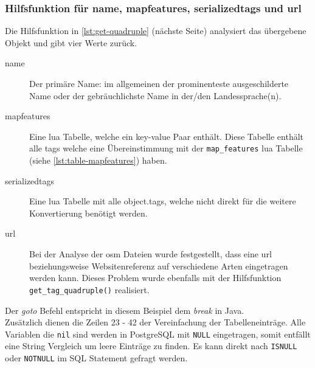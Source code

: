 \subsubsection{Hilfsfunktion für name, mapfeatures, serializedtags und url}\label{subsubsec:get.quadruple}
Die Hilfsfunktion in \autoref{lst:get-quadruple} (nächste Seite) analysiert das übergebene Objekt und gibt vier Werte zurück.
\begin{description}
	\item[name] Der primäre Name: im allgemeinen der prominenteste ausgeschilderte Name oder der gebräuchlichste Name in der/den Landessprache(n). 
	\item[mapfeatures] Eine lua Tabelle, welche ein key-value Paar enthält. Diese Tabelle enthält alle tags welche eine Übereinstimmung mit der \lstinline|map_features| lua Tabelle (siehe \autoref{lst:table-mapfeatures}) haben.
	\item[serializedtags] Eine lua Tabelle mit alle object.tags, welche nicht direkt für die weitere Konvertierung benötigt werden.
	\item[url] Bei der Analyse der osm Dateien wurde festgestellt, dass eine url beziehungsweise Websitenreferenz auf verschiedene Arten eingetragen werden kann. Dieses Problem wurde ebenfalls mit der Hilfsfunktion \lstinline| get_tag_quadruple()| realisiert.
\end{description}
Der \textit{goto} Befehl entspricht in diesem Beispiel dem \textit{break} in Java.\\
Zusätzlich dienen die Zeilen 23 - 42 der Vereinfachung der Tabelleneinträge. Alle Variablen die \lstinline|nil| sind werden in PostgreSQL mit \lstinline|NULL| eingetragen, somit entfällt eine String Vergleich um leere Einträge zu finden. Es kann direkt nach \lstinline|ISNULL| oder \lstinline|NOTNULL| im SQL Statement gefragt werden.

